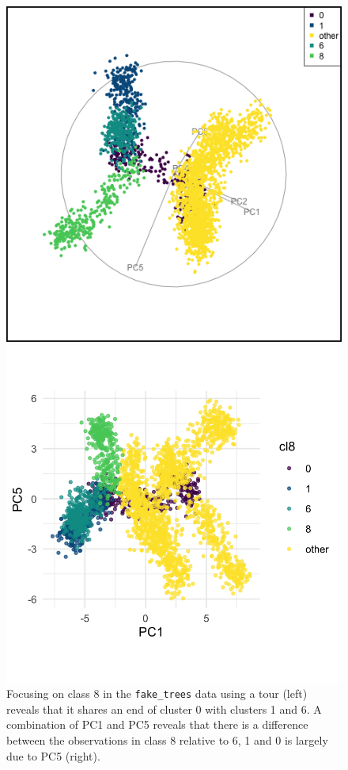 \documentclass[
  letterpaper,
]{krantz}
\begin{document}
\begin{figure}

\begin{minipage}{0.50\linewidth}
\includegraphics{images/ft_cl8.png}\end{minipage}%
%
\begin{minipage}{0.50\linewidth}
\includegraphics{images/fig-ft-cl8-pc-1.png}\end{minipage}%

\caption{\label{fig-ft-cl2}Focusing on class 8 in the
\texttt{fake\_trees} data using a tour (left) reveals that it shares an
end of cluster 0 with clusters 1 and 6. A combination of PC1 and PC5
reveals that there is a difference between the observations in class 8
relative to 6, 1 and 0 is largely due to PC5 (right).}

\end{figure}%
\end{document}
